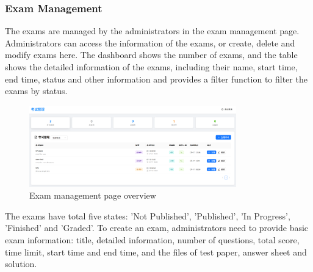 \documentclass[12pt]{article}
\begin{document}
\subsubsection{Exam Management}
The exams are managed by the administrators in the exam management page. Administrators can access the information of the exams, or create, delete and modify exams here.
The dashboard shows the number of exams, and the table shows the detailed information of the exams, including their name, start time, end time, status and other information and
provides a filter function to filter the exams by status.
\begin{figure}[H]
    \centering
    \includegraphics[width=0.8\textwidth]{admin/exammanage.png}
    \caption{Exam management page overview}
    \label{fig:ExamManagement page}
\end{figure}
The exams have total five states: 'Not Published', 'Published', 'In Progress', 'Finished' and 'Graded'.
To create an exam, administrators need to provide basic exam information: title, detailed information, number of questions, total score,
time limit, start time and end time, and the files of test paper, answer sheet and solution.
\end{document}
